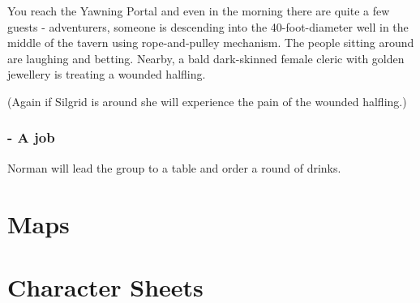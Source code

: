 \documentclass[10pt,onecolumn,twoside,openany,bg=full,layout=true]{dndbook}
\begin{document}
\begin{DndReadAloud}
You reach the Yawning Portal and even in the morning there are quite a few guests - adventurers,
someone is descending into the 40-foot-diameter well in the middle of the tavern using rope-and-pulley mechanism.
The people sitting around are laughing and betting.
Nearby, a bald dark-skinned female cleric with golden jewellery is treating a wounded halfling.
\end{DndReadAloud}
(Again if Silgrid is around she will experience the pain of the wounded halfling.)

\subsection{ - A job}\label{subsec:\arabic{subact_num}-a-job}
\addtocounter{subact_num}{1}
Norman will lead the group to a table and order a round of drinks.








\vfill
\newpage

\chapter{Maps}\label{ch:maps}

\chapter{Character Sheets}\label{ch:charactersheets}
\end{document}
